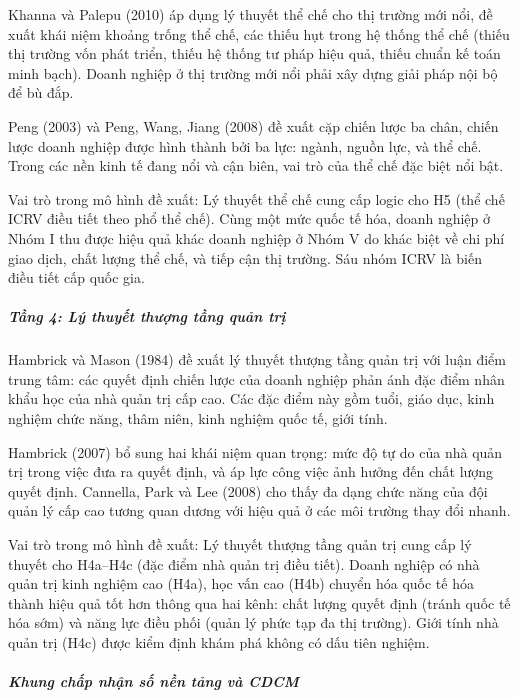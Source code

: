 \documentclass[
  a4paper,
  13pt]{extreport}
\begin{document}
Khanna và Palepu (2010) áp dụng lý thuyết thể chế cho thị trường mới
nổi, đề xuất khái niệm khoảng trống thể chế, các thiếu hụt trong hệ
thống thể chế (thiếu thị trường vốn phát triển, thiếu hệ thống tư pháp
hiệu quả, thiếu chuẩn kế toán minh bạch). Doanh nghiệp ở thị trường mới
nổi phải xây dựng giải pháp nội bộ để bù đắp.

Peng (2003) và Peng, Wang, Jiang (2008) đề xuất cặp chiến lược ba chân,
chiến lược doanh nghiệp được hình thành bởi ba lực: ngành, nguồn lực, và
thể chế. Trong các nền kinh tế đang nổi và cận biên, vai trò của thể chế
đặc biệt nổi bật.

Vai trò trong mô hình đề xuất: Lý thuyết thể chế cung cấp logic cho H5
(thể chế ICRV điều tiết theo phổ thể chế). Cùng một mức quốc tế hóa,
doanh nghiệp ở Nhóm I thu được hiệu quả khác doanh nghiệp ở Nhóm V do
khác biệt về chi phí giao dịch, chất lượng thể chế, và tiếp cận thị
trường. Sáu nhóm ICRV là biến điều tiết cấp quốc gia.

\hypertarget{tux1ea7ng-4-luxfd-thuyux1ebft-thux1b0ux1ee3ng-tux1ea7ng-quux1ea3n-trux1ecb}{%
\subparagraph{Tầng 4: Lý thuyết thượng tầng quản
trị}\label{tux1ea7ng-4-luxfd-thuyux1ebft-thux1b0ux1ee3ng-tux1ea7ng-quux1ea3n-trux1ecb}}

Hambrick và Mason (1984) đề xuất lý thuyết thượng tầng quản trị với luận
điểm trung tâm: các quyết định chiến lược của doanh nghiệp phản ánh đặc
điểm nhân khẩu học của nhà quản trị cấp cao. Các đặc điểm này gồm tuổi,
giáo dục, kinh nghiệm chức năng, thâm niên, kinh nghiệm quốc tế, giới
tính.

Hambrick (2007) bổ sung hai khái niệm quan trọng: mức độ tự do của nhà
quản trị trong việc đưa ra quyết định, và áp lực công việc ảnh hưởng đến
chất lượng quyết định. Cannella, Park và Lee (2008) cho thấy đa dạng
chức năng của đội quản lý cấp cao tương quan dương với hiệu quả ở các
môi trường thay đổi nhanh.

Vai trò trong mô hình đề xuất: Lý thuyết thượng tầng quản trị cung cấp
lý thuyết cho H4a--H4c (đặc điểm nhà quản trị điều tiết). Doanh nghiệp
có nhà quản trị kinh nghiệm cao (H4a), học vấn cao (H4b) chuyển hóa quốc
tế hóa thành hiệu quả tốt hơn thông qua hai kênh: chất lượng quyết định
(tránh quốc tế hóa sớm) và năng lực điều phối (quản lý phức tạp đa thị
trường). Giới tính nhà quản trị (H4c) được kiểm định khám phá không có
dấu tiên nghiệm.

\hypertarget{khung-chux1ea5p-nhux1eadn-sux1ed1-nux1ec1n-tux1ea3ng-vuxe0-cdcm}{%
\subparagraph{Khung chấp nhận số nền tảng và
CDCM}\label{khung-chux1ea5p-nhux1eadn-sux1ed1-nux1ec1n-tux1ea3ng-vuxe0-cdcm}}
\end{document}
